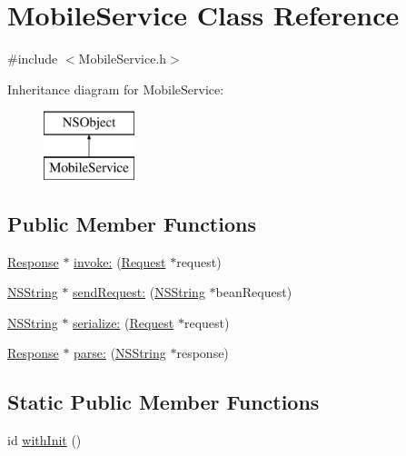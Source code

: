\hypertarget{interface_mobile_service}{
\section{\-Mobile\-Service \-Class \-Reference}
\label{interface_mobile_service}
}


{\ttfamily \#include $<$\-Mobile\-Service.\-h$>$}

\-Inheritance diagram for \-Mobile\-Service\-:\begin{figure}[H]
\begin{center}
\leavevmode
\includegraphics[height=2.000000cm]{interface_mobile_service}
\end{center}
\end{figure}
\subsection*{\-Public \-Member \-Functions}
\begin{DoxyCompactItemize}
\item 
\hyperlink{interface_response}{\-Response} $\ast$ \hyperlink{interface_mobile_service_afccab06a27685cd5b856c08a8bebb463}{invoke\-:} (\hyperlink{interface_request}{\-Request} $\ast$request)
\item 
\hyperlink{class_n_s_string}{\-N\-S\-String} $\ast$ \hyperlink{interface_mobile_service_a07b800377937e7f5a0f3604f0f78a6c1}{send\-Request\-:} (\hyperlink{class_n_s_string}{\-N\-S\-String} $\ast$bean\-Request)
\item 
\hyperlink{class_n_s_string}{\-N\-S\-String} $\ast$ \hyperlink{interface_mobile_service_a52f0671f42c9430cfffbf644fee32858}{serialize\-:} (\hyperlink{interface_request}{\-Request} $\ast$request)
\item 
\hyperlink{interface_response}{\-Response} $\ast$ \hyperlink{interface_mobile_service_a3037792535d9bf043b1bb285e086586d}{parse\-:} (\hyperlink{class_n_s_string}{\-N\-S\-String} $\ast$response)
\end{DoxyCompactItemize}
\subsection*{\-Static \-Public \-Member \-Functions}
\begin{DoxyCompactItemize}
\item 
id \hyperlink{interface_mobile_service_a29618cda82256009388da0e28084a8f8}{with\-Init} ()
\end{DoxyCompactItemize}



